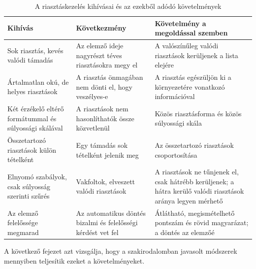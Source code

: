 \begin{table}[H]
    \centering
    \caption{A riasztáskezelés kihívásai és az ezekből adódó követelmények}
    \label{tab:kihivasok}
    \begin{tabular}{|L{4cm}|L{4.4cm}|L{4.8cm}|}
        \hline
        \textbf{Kihívás} & \textbf{Következmény} & \textbf{Követelmény a megoldással szemben} \\ \hline
        Sok riasztás, kevés valódi támadás & Az elemző ideje nagyrészt téves riasztásokra megy el & A valószínűleg valódi riasztások kerüljenek a lista elejére \\ \hline
        Ártalmatlan okú, de helyes riasztások & A riasztás önmagában nem dönti el, hogy veszélyes-e & A riasztás egészüljön ki a környezetére vonatkozó információval \\ \hline
        Két érzékelő eltérő formátummal és súlyossági skálával & A riasztások nem hasonlíthatók össze közvetlenül & Közös riasztásforma és közös súlyossági skála \\ \hline
        Összetartozó riasztások külön tételként & Egy támadás sok tételként jelenik meg & Az összetartozó riasztások csoportosítása \\ \hline
        Elnyomó szabályok, csak súlyosság szerinti szűrés & Vakfoltok, elveszett valódi riasztások & A riasztások ne tűnjenek el, csak hátrébb kerüljenek; a hátra kerülő valódi riasztások aránya legyen mérhető \\ \hline
        Az elemző felelőssége megmarad & Az automatikus döntés bizalmi és felelősségi kérdést vet fel & Átlátható, megismételhető pontszám és rövid magyarázat; a döntés az elemzőé \\ \hline
    \end{tabular}
\end{table}

A következő fejezet azt vizsgálja, hogy a szakirodalomban javasolt módszerek mennyiben teljesítik ezeket a követelményeket.